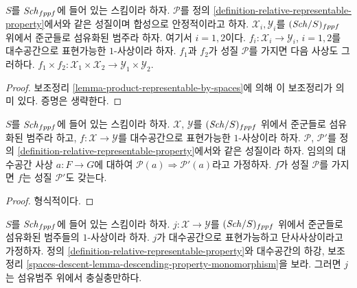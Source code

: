\begin{lemma}
\label{lemma-product-representable-transformations-property}
$S$를 $\mathit{Sch}_{fppf}$에 들어 있는 스킴이라 하자. $\mathcal{P}$를 정의
\ref{definition-relative-representable-property}에서와 같은 성질이며
합성으로 안정적이라고 하자. $\mathcal{X}_i, \mathcal{Y}_i$를
$(\mathit{Sch}/S)_{fppf}$ 위에서 준군들로 섬유화된 범주라 하자. 여기서
$i = 1, 2$이다. $f_i : \mathcal{X}_i \to \mathcal{Y}_i$,
$i = 1, 2$를 대수공간으로 표현가능한 $1$-사상이라 하자. $f_1$과
$f_2$가 성질 $\mathcal{P}$를 가지면 다음 사상도 그러하다.
$
f_1 \times f_2 :
\mathcal{X}_1 \times \mathcal{X}_2
\to
\mathcal{Y}_1 \times \mathcal{Y}_2
$.
\end{lemma}

\begin{proof}
보조정리 \ref{lemma-product-representable-by-spaces}에 의해 이
보조정리가 의미 있다. 증명은 생략한다.
\end{proof}

\begin{lemma}
\label{lemma-representable-transformations-property-implication}
$S$를 $\mathit{Sch}_{fppf}$에 들어 있는 스킴이라 하자. $\mathcal{X}$,
$\mathcal{Y}$를 $(\mathit{Sch}/S)_{fppf}$ 위에서 준군들로 섬유화된 범주라
하고, $f : \mathcal{X} \to \mathcal{Y}$를 대수공간으로 표현가능한
$1$-사상이라 하자. $\mathcal{P}$, $\mathcal{P}'$를 정의
\ref{definition-relative-representable-property}에서와 같은 성질이라
하자. 임의의 대수공간 사상 $a : F \to G$에 대하여
$\mathcal{P}(a) \Rightarrow \mathcal{P}'(a)$라고 가정하자. $f$가 성질
$\mathcal{P}$를 가지면 $f$는 성질 $\mathcal{P}'$도 갖는다.
\end{lemma}

\begin{proof}
형식적이다.
\end{proof}

\begin{lemma}
\label{lemma-open-fibred-category-is-full}
$S$를 $\mathit{Sch}_{fppf}$에 들어 있는 스킴이라 하자.
$j : \mathcal X \to \mathcal Y$를 $(\mathit{Sch}/S)_{fppf}$ 위에서
준군들로 섬유화된 범주들의 $1$-사상이라 하자. $j$가 대수공간으로
표현가능하고 단사사상이라고 가정하자. 정의
\ref{definition-relative-representable-property}와 대수공간의 하강,
보조정리 \ref{spaces-descent-lemma-descending-property-monomorphism}을 보라.
그러면 $j$는 섬유범주 위에서 충실충만하다.
\end{lemma}


